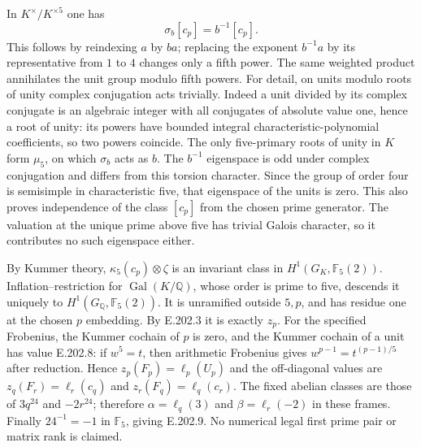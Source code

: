 In $K^\times/K^{\times5}$ one has
\[
              \sigma_b[c_p]=b^{-1}[c_p].
 \tag{E.202.10}
\]
This follows by reindexing $a$ by $ba$; replacing the exponent
$b^{-1}a$ by its representative from $1$ to $4$ changes only a
fifth power.  The same weighted product annihilates the unit group
modulo fifth powers.  For detail, on units modulo roots of unity
complex conjugation acts trivially.  Indeed a unit divided by its
complex conjugate is an algebraic integer with all conjugates of
absolute value one, hence a root of unity: its powers have bounded
integral characteristic-polynomial coefficients, so two powers
coincide.  The only five-primary roots of unity in $K$ form
$\mu_5$, on which $\sigma_b$ acts as $b$.  The $b^{-1}$
eigenspace is odd under complex conjugation and differs from this
torsion character.  Since the group of order four is semisimple
in characteristic five, that eigenspace of the units is zero.
This also proves independence of the class $[c_p]$ from the chosen
prime generator.  The valuation at the unique prime above five
has trivial Galois character, so it contributes no such eigenspace
either.

By Kummer theory, $\kappa_5(c_p)\otimes\zeta$ is an invariant
class in $H^1(G_K,\mathbb F_5(2))$.  Inflation--restriction for
$\operatorname{Gal}(K/\mathbb Q)$, whose order is prime to five,
descends it uniquely to $H^1(G_{\mathbb Q},\mathbb F_5(2))$.
It is unramified outside $5,p$, and has residue one at the chosen
$p$ embedding.  By E.202.3 it is exactly $z_p$.
For the specified Frobenius, the Kummer cochain of $p$ is zero,
and the Kummer cochain of a unit has value E.202.8: if $w^5=t$,
then arithmetic Frobenius gives $w^{p-1}=t^{(p-1)/5}$ after
reduction.  Hence $z_p(F_p)=\ell_p(U_p)$ and the off-diagonal
values are $z_q(F_r)=\ell_r(c_q)$ and
$z_r(F_q)=\ell_q(c_r)$.
The fixed abelian classes are those of $3q^{24}$ and $-2r^{24}$;
therefore $\alpha=\ell_q(3)$ and $\beta=\ell_r(-2)$ in these
frames.  Finally $24^{-1}=-1$ in $\mathbb F_5$, giving E.202.9.
No numerical legal first prime pair or matrix rank is claimed.

